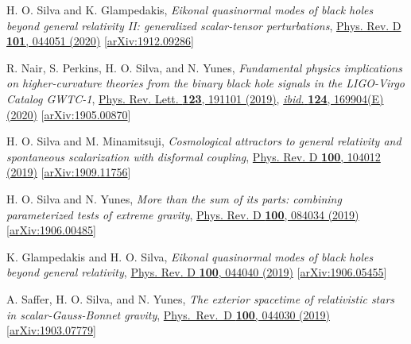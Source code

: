 \documentclass[11pt]{article}
\begin{document}
\begin{etaremune}[
        start=\value{pubCounter},
        topsep=0pt,
        partopsep=0pt]
    \item H. O. Silva and K. Glampedakis,
    \emph{Eikonal quasinormal modes of black holes beyond general relativity II: generalized scalar-tensor perturbations},
    \href{https://journals.aps.org/prd/abstract/10.1103/PhysRevD.101.044051}{Phys. Rev. D {\bf 101}, 044051 (2020)}
    [\href{https://arxiv.org/abs/1912.09286}{arXiv:1912.09286}]

    \item R. Nair, S. Perkins, H. O. Silva, and N. Yunes,
    \emph{Fundamental physics implications on higher-curvature theories from
          the binary black hole signals in the LIGO-Virgo Catalog GWTC-1},
    \href{https://link.aps.org/doi/10.1103/PhysRevLett.123.191101}{Phys. Rev. Lett. {\bf 123}, 191101 (2019)},
    \href{https://journals.aps.org/prl/abstract/10.1103/PhysRevLett.124.169904}{\emph{ibid.} {\bf 124}, 169904(E) (2020)}
    [\href{https://arxiv.org/abs/1905.00870}{arXiv:1905.00870}]
    \label{pub:nairPRL2020}

    \item H. O. Silva and M. Minamitsuji,
    \emph{Cosmological attractors to general relativity and spontaneous scalarization with disformal coupling},
    \href{https://link.aps.org/doi/10.1103/PhysRevD.100.104012}{Phys. Rev. D {\bf 100}, 104012 (2019)}
    [\href{https://arxiv.org/abs/1909.11756}{arXiv:1909.11756}]

    \item H. O. Silva and N. Yunes,
    \emph{More than the sum of its parts: combining parameterized tests of extreme gravity},
    \href{https://link.aps.org/doi/10.1103/PhysRevD.100.084034}{Phys. Rev. D {\bf 100}, 084034 (2019)}
    [\href{https://arxiv.org/abs/1906.00485}{arXiv:1906.00485}]

    \item K. Glampedakis and H. O. Silva,
    \emph{Eikonal quasinormal modes of black holes beyond general relativity},
    \href{https://journals.aps.org/prd/abstract/10.1103/PhysRevD.100.044040}{Phys. Rev. D {\bf 100}, 044040 (2019)}
    [\href{https://arxiv.org/abs/1906.05455}{arXiv:1906.05455}]

    \item A. Saffer, H. O. Silva, and N. Yunes,
    \emph{The exterior spacetime of relativistic stars in scalar-Gauss-Bonnet gravity},
    \href{https://journals.aps.org/prd/abstract/10.1103/PhysRevD.100.044030}{Phys.~Rev.~D {\bf 100}, 044030 (2019)}
    [\href{https://arxiv.org/abs/1903.07779}{arXiv:1903.07779}]


\end{etaremune}
\end{document}
